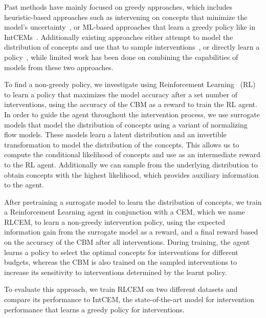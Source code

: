 Past methods have mainly focused on greedy approaches, which
includes heuristic-based approaches such as intervening on concepts that minimize the
model's uncertainty~\cite{coop}, or ML-based approaches that learn a greedy policy
like in IntCEMs~\cite{intcem}. Additionally existing approaches either 
attempt to model the distribution of concepts and use that
to sample interventions~\cite{energycem}, 
or directly learn a policy~\cite{intcem}, while limited
work has been done on combining the capabilities of models 
from these two approaches.

To find a non-greedy policy, we investigate using Reinforcement Learning~\cite{rl} (RL) 
to learn a policy that maximizes
the model accuracy after a set number of interventions,
using the accuracy of the CBM as a reward to train the RL agent.
In order
to guide the agent throughout the intervention process,
we use surrogate models that model the distribution of concepts using
a variant of normalizing flow models. These models learn a latent distribution
and an invertible transformation to model the distribution of the concepts.
This allows us to compute the conditional likelihood of concepts 
and use as an intermediate reward to the RL agent. Additionally we can sample
from the underlying distribution to obtain concepts with the highest likelihood,
which provides auxiliary information to the agent.

After pretraining a surrogate model to learn the distribution of concepts,
we train a Reinforcement Learning agent in conjunction with a CEM, which we name RLCEM, to learn a 
non-greedy intervention policy, using
the expected information gain from the surrogate model
as a reward, and a final reward based on the 
accuracy of the CBM after all interventions.
During training,
the agent learns a policy to select
the optimal concepts for interventions for different budgets,
whereas the CBM is also trained on the sampled interventions
to increase its sensitivity to interventions determined by 
the learnt policy.

To evaluate this approach, we train RLCEM on two different datasets
and compare its performance to IntCEM, the state-of-the-art 
model for intervention performance that learns a greedy policy 
for interventions.


